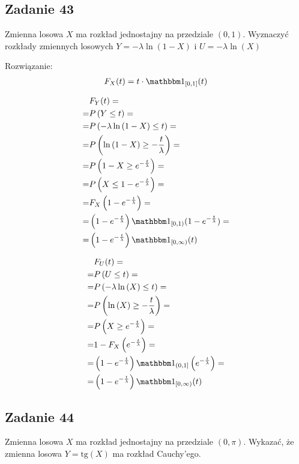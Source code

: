 \subsection*{Zadanie 43}
Zmienna losowa $ X $ ma rozkład jednostajny na przedziale $ (0,1) $. Wyznaczyć rozkłady zmiennych losowych $ Y=-\lambda\ln \left(1-X\right) $ i $ U=-\lambda\ln \left(X\right) $

Rozwiązanie:
\begin{gather*}
F_X(t)=t\cdot \mathbbm1_{[0,1]}(t)
\end{gather*}
\begin{minipage}[t]{0.5\linewidth}
\begin{align*}
&F_Y(t)
=\\=&
P\left(Y\le t\right)
=\\=&
P\left(-\lambda\ln \left(1-X\right)\le t\right)
=\\=&
P\left(\ln \left(1-X\right)\ge-\frac{t}{\lambda}\right)
=\\=&
P\left(1-X\ge e^{-\frac{t}{\lambda}}\right)
=\\=&
P\left(X\le 1-e^{-\frac{t}{\lambda }}\right)
=\\=&
F_X\left(1-e^{-\frac{t}{\lambda }}\right)
=\\=&
\left(1-e^{-\frac{t}{\lambda }}\right)\mathbbm1_{[0,1)}(1-e^{-\frac{t}{\lambda }})
=\\=&
\left(1-e^{-\frac{t}{\lambda }}\right)\mathbbm1_{[0,\infty )}(t)
\end{align*}
\end{minipage}
\begin{minipage}[t]{0.5\linewidth}
\begin{align*}
&F_U(t)
=\\=&
P\left(U\le t\right)
=\\=&
P\left(-\lambda\ln \left(X\right)\le t\right)
=\\=&
P\left(\ln \left(X\right)\ge -\frac{t}{\lambda}\right)
=\\=&
P\left(X\ge e^{-\frac{t}{\lambda }}\right)
=\\=&
1-F_X\left(e^{-\frac{t}{\lambda }}\right)
=\\=&
\left(1-e^{-\frac{t}{\lambda }}\right)\mathbbm1_{(0,1]}\left(e^{-\frac{t}{\lambda }}\right)
=\\=&
\left(1-e^{-\frac{t}{\lambda }}\right)\mathbbm1_{[0,\infty) }(t)
\end{align*}
\end{minipage}


\subsection*{Zadanie 44}
Zmienna losowa $ X $ ma rozkład jednostajny na przedziale $ (0,\pi) $. Wykazać, że zmienna losowa $ Y=\text{tg}(X) $ ma rozkład Cauchy'ego.

